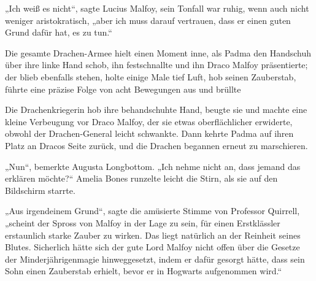 „Ich weiß es nicht“, sagte Lucius Malfoy, sein Tonfall war ruhig, wenn auch nicht weniger aristokratisch, „aber ich muss darauf vertrauen, dass er einen guten Grund dafür hat, es zu tun.“

Die gesamte Drachen-Armee hielt einen Moment inne, als Padma den Handschuh über ihre linke Hand schob, ihn festschnallte und ihn Draco Malfoy präsentierte; der blieb ebenfalls stehen, holte einige Male tief Luft, hob seinen Zauberstab, führte eine präzise Folge von acht Bewegungen aus und brüllte 

Die Drachenkriegerin hob ihre behandschuhte Hand, beugte sie und machte eine kleine Verbeugung vor Draco Malfoy, der sie etwas oberflächlicher erwiderte, obwohl der Drachen-General leicht schwankte. Dann kehrte Padma auf ihren Platz an Dracos Seite zurück, und die Drachen begannen erneut zu marschieren.

„Nun“, bemerkte Augusta Longbottom.
„Ich nehme nicht an, dass jemand das erklären möchte?“ Amelia Bones runzelte leicht die Stirn, als sie auf den Bildschirm starrte.

„Aus irgendeinem Grund“, sagte die amüsierte Stimme von Professor Quirrell, „scheint der Spross von Malfoy in der Lage zu sein, für einen Erstklässler erstaunlich starke Zauber zu wirken. Das liegt natürlich an der Reinheit seines Blutes. Sicherlich hätte sich der gute Lord Malfoy nicht offen über die Gesetze der Minderjährigenmagie hinweggesetzt, indem er dafür gesorgt hätte, dass sein Sohn einen Zauberstab erhielt, bevor er in Hogwarts aufgenommen wird.“

